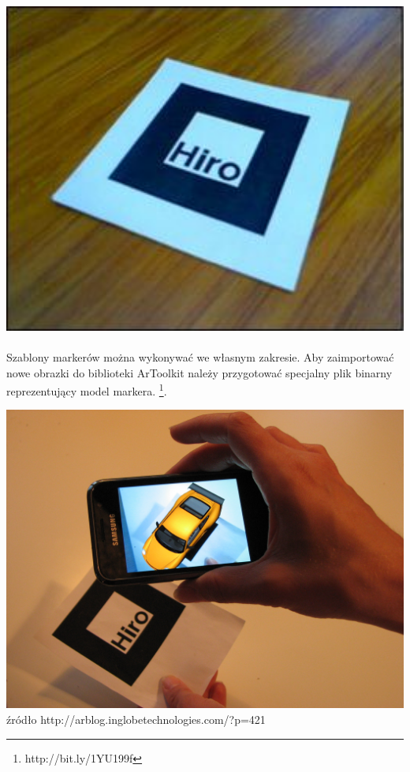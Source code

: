 \begin{center}
\includegraphics[width=1\textwidth]{images/hiro.png}

\end{center}
\paragraph{}
Szablony markerów można wykonywać we własnym zakresie. Aby zaimportować nowe obrazki do biblioteki ArToolkit należy przygotować specjalny plik binarny reprezentujący model markera.
\footnote{http://bit.ly/1YU199f}.

\begin{center}
\includegraphics[width=1\textwidth]{images/artoolkit-demo.jpg}
\small {źródło http://arblog.inglobetechnologies.com/?p=421}
\end{center}
